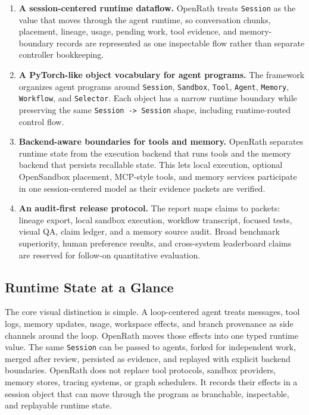 \documentclass{llmxive}
\begin{document}
\begin{enumerate}[itemsep=0.1em, topsep=0.2em]
  \item \textbf{A session-centered runtime dataflow.}
  OpenRath treats \texttt{Session} as the value that moves through the agent
  runtime, so conversation chunks, placement, lineage, usage, pending work,
  tool evidence, and memory-boundary records are represented as one inspectable
  flow rather than separate controller bookkeeping.

  \item \textbf{A PyTorch-like object vocabulary for agent programs.}
  The framework organizes agent programs around
  \texttt{Session}, \texttt{Sandbox}, \texttt{Tool}, \texttt{Agent},
  \texttt{Memory}, \texttt{Workflow}, and \texttt{Selector}. Each object has a
  narrow runtime boundary while preserving the same \texttt{Session -> Session}
  shape, including runtime-routed control flow.

  \item \textbf{Backend-aware boundaries for tools and memory.}
  OpenRath separates runtime state from the execution backend that runs tools
  and the memory backend that persists recallable state. This lets local
  execution, optional OpenSandbox placement, MCP-style tools, and memory
  services participate in one session-centered model as their evidence packets
  are verified.

  \item \textbf{An audit-first release protocol.}
  The report maps claims to packets: lineage export, local sandbox execution,
  workflow transcript, focused tests, visual QA, claim ledger, and a
  memory source audit. Broad benchmark superiority, human preference
  results, and cross-system leaderboard claims are reserved for follow-on
  quantitative evaluation.
\end{enumerate}


\subsection{Runtime State at a Glance}
The core visual distinction is simple. A loop-centered agent treats messages,
tool logs, memory updates, usage, workspace effects, and branch provenance as
side channels around the loop. OpenRath moves those effects into one typed
runtime value. The same \texttt{Session} can be passed to agents, forked for
independent work, merged after review, persisted as evidence, and replayed with
explicit backend boundaries. OpenRath does not replace tool protocols, sandbox
providers, memory stores, tracing systems, or graph schedulers. It records
their effects in a session object that can move through the program as
branchable, inspectable, and replayable runtime state.
\end{document}
